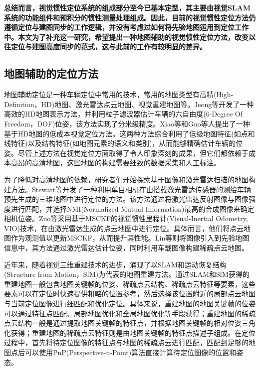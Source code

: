 \textbf{总结而言，视觉惯性定位系统的组成部分至今已基本定型，其主要由视觉SLAM系统的功能组件和预积分的惯性测量处理组成。因此，目前的视觉惯性定位方法仍遵循定位与建图同步的工作逻辑，并没有考虑过如何将先验地图运用到定位工作中。本文为了补充这一研究，希望提出一种地图辅助的视觉惯性定位方法，改变以往定位与建图高度同步的范式，这与此前的工作有较明显的差异。}

\subsection{地图辅助的定位方法}
地图辅助定位是一种车辆定位中常用的技术，常用的地图类型有高精(High-Definition，HD)地图、激光雷达点云地图、视觉重建地图等。Jeong等\cite{jeong2020hdmi}开发了一种高效的HD地图表示方法，并利用粒子滤波器估计车辆的六自由度(6-Degree Of Freedom，DOF)位姿，该方法实现了分米级精度。Xiao等\cite{xiao2020monocular}和Guo等人\cite{guo2021coarse}提出了一种基于HD地图的低成本视觉定位方法。这两种方法综合利用了低级地图特征(如点和线特征)以及结构特征(如地图元素的语义和类别)，从而能够精确估计车辆的位姿。尽管上述方法在视觉定位方面取得了令人印象深刻的成果，但它们都依赖于成本高昂的高清地图，这些地图的构建需要细致的数据采集和人工标注。

为了降低对高清地图的依赖，研究者们开始探索基于图像和激光雷达扫描的地图构建方法。Stewart等\cite{stewart2012laps}开发了一种利用单目相机在由搭载激光雷达传感器的测绘车辆预先生成的三维地图中进行定位的方法。该方法通过将激光雷达反射图像与图像强度进行匹配，并选择NMI(Normalized Mutual Information)最高的合成图像来确定相机位姿。Zuo等\cite{zuo2019visual}采用基于MSCKF的视觉惯性里程计(Visual-Inertial Odometry, VIO)技术，在由激光雷达生成的点云地图中进行定位。具体而言，他们将点云地图作为观测值以更新MSCKF，从而提升其性能。Lin等\cite{lin2021autonomous}则将图像引入到先验地图信息中，其方法通过激光雷达估计位姿，同时利用车载图像构建稀疏点云地图。

近年来，随着视觉三维重建技术的进步，涌现了以SLAM和运动恢复结构(Structure from Motion，SfM)\cite{schonberger2016structure}为代表的地图重建方法。通过SLAM和SfM获得的重建地图一般包含地图关键帧的位姿、稀疏点云结构、稀疏点云特征等要素，这些要素可以在定位时快速提供粗略的位置参考，然后选择该位置附近的局部点云地图与当前定位图像进行细匹配和优化定位。具体来说，重建地图的地图关键帧的位姿可以通过特征点匹配、局部地图优化和全局地图优化等手段获得；重建地图的稀疏点云结构一般是通过提取地图关键帧的特征点，并根据地图关键帧的相对位姿三角化获得；重建地图的稀疏点云特征则是由地图关键帧的特征点描述子组成。在定位过程中，首先将待定位图像的特征点与地图的稀疏点云进行匹配，匹配到足够的地图点后可以使用PnP(Perspective-n-Point)算法直接计算待定位图像的位置和姿态。

